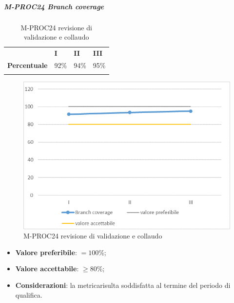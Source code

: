 \subparagraph{M-PROC24 Branch coverage} \mbox{}
\begin{longtable}[H!] {						
		>{}p{35mm}  		
		>{}p{12mm}
		>{}p{12mm}		
		>{}p{12mm}		
	}
	\rowcolor{gray!50}
	\textbf{} & \textbf{I} & \textbf{II} & \textbf{III} \TBstrut \\ [2mm]
	\textbf{Percentuale} & 92\% & 94\% & 95\% \TBstrut \\ [2mm]
	\rowcolor{white}
	\caption{M-PROC24 revisione di validazione e collaudo}
\end{longtable}
\begin{figure}[H] 	
	\includegraphics[width=\linewidth]{./img/grafici/RA24.png}	
	\caption{M-PROC24 revisione di validazione e collaudo}	
\end{figure}
\begin{itemize}
	\item \textbf{Valore preferibile}: $=100\%$;
	\item \textbf{Valore accettabile}: $\ge 80\%$;
	\item \textbf{Considerazioni}: la metrica\glosp risulta soddisfatta al termine del periodo di qualifica.
\end{itemize}

